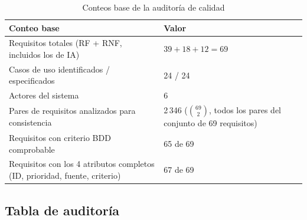 \documentclass[11pt,a4paper]{article}
\begin{document}
\begin{table}[!htbp]
\centering
\caption{Conteos base de la auditoría de calidad}
\label{tab:conteos-base}
\begin{tabular}{|L{7.4cm}|C{3.0cm}|}
\hline
{}\textbf{Conteo base} & \textbf{Valor} \\ \hline
Requisitos totales (RF + RNF, incluidos los de IA) & $39 + 18 + 12 = 69$ \\ \hline
Casos de uso identificados / especificados & 24 / 24 \\ \hline
Actores del sistema & 6 \\ \hline
Pares de requisitos analizados para consistencia & 2\,346 ($\binom{69}{2}$, todos los pares del
conjunto de 69 requisitos) \\ \hline
Requisitos con criterio BDD comprobable & 65 de 69 \\ \hline
Requisitos con los 4 atributos completos (ID, prioridad, fuente, criterio) & 67 de 69 \\ \hline
\end{tabular}
\end{table}

\subsection{Tabla de auditoría}
\end{document}

